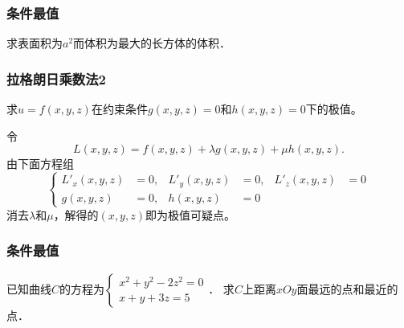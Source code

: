 \documentclass[14pt,notheorems,leqno,xcolor={rgb}]{beamer} %
\begin{document}
\begin{frame}
\frametitle{条件最值}
\begin{example}
求表面积为$a^2$而体积为最大的长方体的体积．
\end{example}
\end{frame}

\begin{iframe}
\frametitle{拉格朗日乘数法2}
\begin{problem*}
求$u=f(x,y,z)$在约束条件$g(x,y,z)=0$和$h(x,y,z)=0$下的极值。
\end{problem*}
\pause
\begin{method*}
令$$L(x,y,z)=f(x,y,z)+\lambda g(x,y,z)+\mu h(x,y,z).$$\pause
由下面方程组$$\left\{\begin{aligned}
L'_x(x,y,z)&=0, & L'_y(x,y,z)&=0, & L'_z(x,y,z)&=0\\
g(x,y,z)&=0, & h(x,y,z)&=0
\end{aligned}\right.$$\pause
消去$\lambda$和$\mu$，解得的$(x,y,z)$即为极值可疑点。
\end{method*}
\end{iframe}

\begin{iframe}
\frametitle{条件最值}
\begin{example}%
已知曲线$C$的方程为$\left\{\begin{array}{l}x^2+y^2-2z^2=0 \\ x+y+3z=5\end{array}\right.$．
求$C$上距离$xOy$面最远的点和最近的点．
\end{example}
\end{iframe}
\end{document}
